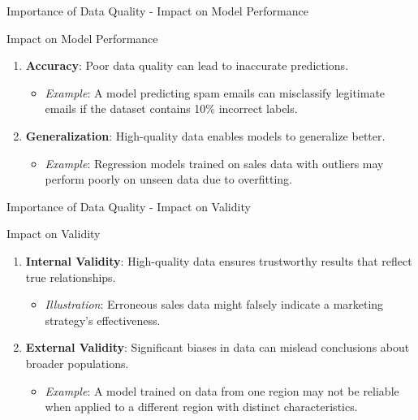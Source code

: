 \documentclass[aspectratio=169]{beamer}
\begin{document}
\begin{frame}[fragile]{Importance of Data Quality - Impact on Model Performance}
    \begin{block}{Impact on Model Performance}
        \begin{enumerate}
            \item \textbf{Accuracy}: Poor data quality can lead to inaccurate predictions.
            \begin{itemize}
                \item \textit{Example}: A model predicting spam emails can misclassify legitimate emails if the dataset contains 10\% incorrect labels.
            \end{itemize}
            
            \item \textbf{Generalization}: High-quality data enables models to generalize better. 
            \begin{itemize}
                \item \textit{Example}: Regression models trained on sales data with outliers may perform poorly on unseen data due to overfitting.
            \end{itemize}
        \end{enumerate}
    \end{block}
\end{frame}

\begin{frame}[fragile]{Importance of Data Quality - Impact on Validity}
    \begin{block}{Impact on Validity}
        \begin{enumerate}
            \item \textbf{Internal Validity}: High-quality data ensures trustworthy results that reflect true relationships.
            \begin{itemize}
                \item \textit{Illustration}: Erroneous sales data might falsely indicate a marketing strategy's effectiveness.
            \end{itemize}
            
            \item \textbf{External Validity}: Significant biases in data can mislead conclusions about broader populations.
            \begin{itemize}
                \item \textit{Example}: A model trained on data from one region may not be reliable when applied to a different region with distinct characteristics.
            \end{itemize}
        \end{enumerate}
    \end{block}
\end{frame}
\end{document}
